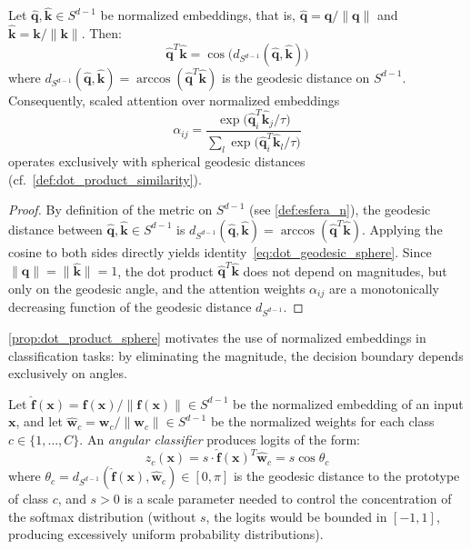 \begin{proposition}\label{prop:dot_product_sphere}
Let $\hat{\mathbf{q}}, \hat{\mathbf{k}} \in S^{d-1}$ be normalized embeddings, that is, $\hat{\mathbf{q}} = \mathbf{q}/\|\mathbf{q}\|$ and $\hat{\mathbf{k}} = \mathbf{k}/\|\mathbf{k}\|$. Then:
\begin{equation}
\hat{\mathbf{q}}^T \hat{\mathbf{k}} = \cos\bigl(d_{S^{d-1}}(\hat{\mathbf{q}}, \hat{\mathbf{k}})\bigr)
\label{eq:dot_geodesic_sphere}
\end{equation}
where $d_{S^{d-1}}(\hat{\mathbf{q}}, \hat{\mathbf{k}}) = \arccos(\hat{\mathbf{q}}^T \hat{\mathbf{k}})$ is the geodesic distance on $S^{d-1}$. Consequently, scaled attention over normalized embeddings
\[
\alpha_{ij} = \frac{\exp\bigl(\hat{\mathbf{q}}_i^T \hat{\mathbf{k}}_j / \tau\bigr)}{\sum_l \exp\bigl(\hat{\mathbf{q}}_i^T \hat{\mathbf{k}}_l / \tau\bigr)}
\]
operates exclusively with spherical geodesic distances (cf.\ \autoref{def:dot_product_similarity}).
\end{proposition}

\begin{proof}
By definition of the metric on $S^{d-1}$ (see \autoref{def:esfera_n}), the geodesic distance between $\hat{\mathbf{q}}, \hat{\mathbf{k}} \in S^{d-1}$ is $d_{S^{d-1}}(\hat{\mathbf{q}}, \hat{\mathbf{k}}) = \arccos(\hat{\mathbf{q}}^T \hat{\mathbf{k}})$. Applying the cosine to both sides directly yields identity~\eqref{eq:dot_geodesic_sphere}. Since $\|\hat{\mathbf{q}}\| = \|\hat{\mathbf{k}}\| = 1$, the dot product $\hat{\mathbf{q}}^T \hat{\mathbf{k}}$ does not depend on magnitudes, but only on the geodesic angle, and the attention weights $\alpha_{ij}$ are a monotonically decreasing function of the geodesic distance $d_{S^{d-1}}$.
\end{proof}

\autoref{prop:dot_product_sphere} motivates the use of normalized embeddings in classification tasks: by eliminating the magnitude, the decision boundary depends exclusively on angles.

\begin{definition}\label{def:clasificador_angular}
Let $\hat{\mathbf{f}}(\mathbf{x}) = \mathbf{f}(\mathbf{x})/\|\mathbf{f}(\mathbf{x})\| \in S^{d-1}$ be the normalized embedding of an input $\mathbf{x}$, and let $\hat{\mathbf{w}}_c = \mathbf{w}_c/\|\mathbf{w}_c\| \in S^{d-1}$ be the normalized weights for each class $c \in \{1, \ldots, C\}$. An \textit{angular classifier} \citep{wang2017normface} produces logits of the form:
\begin{equation}
z_c(\mathbf{x}) = s \cdot \hat{\mathbf{f}}(\mathbf{x})^T \hat{\mathbf{w}}_c = s \cos\theta_c
\label{eq:clasificador_angular}
\end{equation}
where $\theta_c = d_{S^{d-1}}(\hat{\mathbf{f}}(\mathbf{x}), \hat{\mathbf{w}}_c) \in [0, \pi]$ is the geodesic distance to the prototype of class $c$, and $s > 0$ is a scale parameter needed to control the concentration of the softmax distribution (without $s$, the logits would be bounded in $[-1, 1]$, producing excessively uniform probability distributions).
\end{definition}

